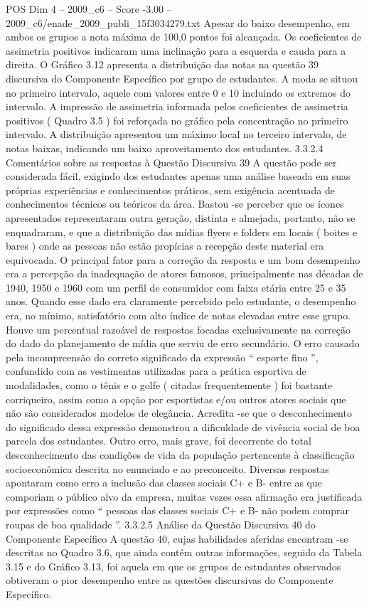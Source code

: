 \begin{textsample}{POS Dim 4 – 2009\_c6 – Score -3.00 – 2009\_c6/enade\_2009\_publi\_15f3034279.txt}
Apesar do baixo desempenho, em ambos os grupos a nota máxima de 100,0 pontos foi alcançada.
Os coeficientes de assimetria positivos indicaram uma inclinação para a esquerda e cauda para a direita.
O Gráfico 3.12 apresenta a distribuição das notas na questão 39 discursiva do Componente Específico por grupo de estudantes.
A moda se situou no primeiro intervalo, aquele com valores entre 0 e 10 incluindo os extremos do intervalo.
A impressão de assimetria informada pelos coeficientes de assimetria positivos ( Quadro 3.5 ) foi reforçada no gráfico pela concentração no primeiro intervalo.
A distribuição apresentou um máximo local no terceiro intervalo, de notas baixas, indicando um baixo aproveitamento dos estudantes. 3.3.2.4 Comentários sobre as respostas à Questão Discursiva 39 A questão pode ser considerada fácil, exigindo dos estudantes apenas uma análise baseada em suas próprias experiências e conhecimentos práticos, sem exigência acentuada de conhecimentos técnicos ou teóricos da área.
Bastou -se perceber que os ícones apresentados representaram outra geração, distinta e almejada, portanto, não se enquadraram, e que a distribuição das mídias flyers e folders em locais ( boites e bares ) onde as pessoas não estão propícias a recepção deste material era equivocada.
O principal fator para a correção da resposta e um bom desempenho era a percepção da inadequação de atores famosos, principalmente nas décadas de 1940, 1950 e 1960 com um perfil de consumidor com faixa etária entre 25 e 35 anos.
Quando esse dado era claramente percebido pelo estudante, o desempenho era, no mínimo, satisfatório com alto índice de notas elevadas entre esse grupo.
Houve um percentual razoável de respostas focadas exclusivamente na correção do dado do planejamento de mídia que serviu de erro secundário.
O erro causado pela incompreensão do correto significado da expressão “ esporte fino ”, confundido com as vestimentas utilizadas para a prática esportiva de modalidades, como o tênis e o golfe ( citadas frequentemente ) foi bastante corriqueiro, assim como a opção por esportistas e/ou outros atores sociais que não são considerados modelos de elegância.
Acredita -se que o desconhecimento do significado dessa expressão demonstrou a dificuldade de vivência social de boa parcela dos estudantes.
Outro erro, mais grave, foi decorrente do total desconhecimento das condições de vida da população pertencente à classificação socioeconômica descrita no enunciado e ao preconceito.
Diversas respostas apontaram como erro a inclusão das classes sociais C+ e B- entre as que comporiam o público alvo da empresa, muitas vezes essa afirmação era justificada por expressões como “ pessoas das classes sociais C+ e B- não podem comprar roupas de boa qualidade ”. 3.3.2.5 Análise da Questão Discursiva 40 do Componente Específico A questão 40, cujas habilidades aferidas encontram -se descritas no Quadro 3.6, que ainda contém outras informações, seguido da Tabela 3.15 e do Gráfico 3.13, foi aquela em que os grupos de estudantes observados obtiveram o pior desempenho entre as questões discursivas do Componente Específico.

\end{textsample}
